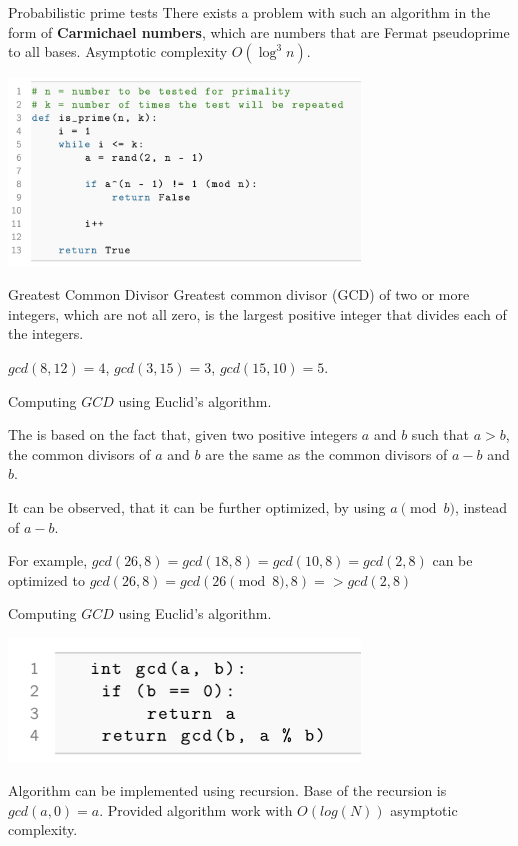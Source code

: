\documentclass{beamer}
\begin{document}
    \begin{frame}{Probabilistic prime tests}
        There exists a problem with such an algorithm in the form of \textbf{Carmichael numbers}, which are numbers that are Fermat pseudoprime to all bases.
        Asymptotic complexity $O(\log^3{n})$.

        \includegraphics[width=0.7\textwidth]{images/lecture_2/prime-test-prob.png}
    \end{frame}


    \begin{frame}{Greatest Common Divisor}
        Greatest common divisor (GCD) of two or more integers, which are not all zero, is the largest positive integer that divides each of the integers. 

        \begin{example}
            $gcd(8, 12) = 4$, 
            $gcd(3, 15) = 3$, 
            $gcd(15, 10) = 5$.
        \end{example}

    \end{frame}

    \begin{frame}{Computing $GCD$ using Euclid's algorithm. }
        
The is based on the fact that, given two positive integers $a$ and $b$ such that $a > b$, 
the common divisors of $a$ and $b$ are the same as the common divisors of $a - b$ and $b$. 

It can be observed, that it can be further optimized, by using $a \pmod{b}$, instead of $a - b$. 

For example, $gcd(26, 8) = gcd(18, 8) = gcd(10, 8) = gcd(2, 8)$ can be optimized to $gcd(26, 8) = gcd(26 \pmod{8}, 8) => gcd(2, 8)$


    \end{frame}

    \begin{frame}{Computing $GCD$ using Euclid's algorithm. }
        
        \includegraphics[width=0.7\textwidth]{images/lecture_2/gcd.png}

        Algorithm can be implemented using recursion. Base of the recursion is $gcd(a, 0) = a$.
        Provided algorithm work with $O(log(N))$ asymptotic complexity.
        
    \end{frame}
\end{document}
